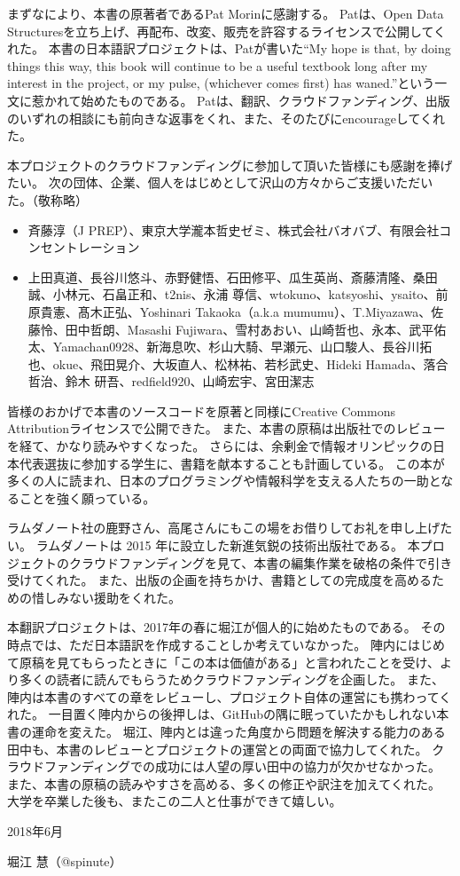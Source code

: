 まずなにより、本書の原著者であるPat Morinに感謝する。
Patは、Open Data Structuresを立ち上げ、再配布、改変、販売を許容するライセンスで公開してくれた。
本書の日本語訳プロジェクトは、Patが書いた``My hope is that, by doing things this way, this book will continue to be a useful textbook long after my interest in the project, or my pulse, (whichever comes first) has waned.''という一文に惹かれて始めたものである。
Patは、翻訳、クラウドファンディング、出版のいずれの相談にも前向きな返事をくれ、また、そのたびにencourageしてくれた。

本プロジェクトのクラウドファンディングに参加して頂いた皆様にも感謝を捧げたい。
次の団体、企業、個人をはじめとして沢山の方々からご支援いただいた。（敬称略） %
\begin{itemize}
\item 斉藤淳（J PREP）、東京大学瀧本哲史ゼミ、株式会社バオバブ、有限会社コンセントレーション
\item 上田真道、長谷川悠斗、赤野健悟、石田修平、瓜生英尚、斎藤清隆、桑田誠、小林元、石畠正和、t2nis、永浦 尊信、wtokuno、katsyoshi、ysaito、前原貴憲、髙木正弘、Yoshinari Takaoka（a.k.a mumumu）、T.Miyazawa、佐藤怜、田中哲朗、Masashi Fujiwara、雪村あおい、山崎哲也、永本、武平佑太、Yamachan0928、新海息吹、杉山大騎、早瀬元、山口駿人、長谷川拓也、okue、飛田晃介、大坂直人、松林祐、若杉武史、Hideki Hamada、落合哲治、鈴木 研吾、redfield920、山崎宏宇、宮田潔志
\end{itemize}

皆様のおかげで本書のソースコードを原著と同様にCreative Commons Attributionライセンスで公開できた。
また、本書の原稿は出版社でのレビューを経て、かなり読みやすくなった。
さらには、余剰金で情報オリンピックの日本代表選抜に参加する学生に、書籍を献本することも計画している。
この本が多くの人に読まれ、日本のプログラミングや情報科学を支える人たちの一助となることを強く願っている。

ラムダノート社の鹿野さん、高尾さんにもこの場をお借りしてお礼を申し上げたい。
ラムダノートは 2015 年に設立した新進気鋭の技術出版社である。
本プロジェクトのクラウドファンディングを見て、本書の編集作業を破格の条件で引き受けてくれた。
また、出版の企画を持ちかけ、書籍としての完成度を高めるための惜しみない援助をくれた。

本翻訳プロジェクトは、2017年の春に堀江が個人的に始めたものである。
その時点では、ただ日本語訳を作成することしか考えていなかった。
陣内にはじめて原稿を見てもらったときに「この本は価値がある」と言われたことを受け、より多くの読者に読んでもらうためクラウドファンディングを企画した。
また、陣内は本書のすべての章をレビューし、プロジェクト自体の運営にも携わってくれた。
一目置く陣内からの後押しは、GitHubの隅に眠っていたかもしれない本書の運命を変えた。
堀江、陣内とは違った角度から問題を解決する能力のある田中も、本書のレビューとプロジェクトの運営との両面で協力してくれた。
クラウドファンディングでの成功には人望の厚い田中の協力が欠かせなかった。
また、本書の原稿の読みやすさを高める、多くの修正や訳注を加えてくれた。
大学を卒業した後も、またこの二人と仕事ができて嬉しい。

\noindent\hspace*{2em}
2018年6月

\hfill 堀江 慧（@spinute）
